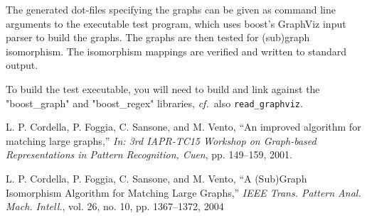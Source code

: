 \documentclass[12pt]{article}
\def\cf{{\it cf.\ }}
\begin{document}
The generated dot-files specifying the graphs can be given as command line
arguments to the executable test program, which uses boost's GraphViz input
parser to build the graphs. The graphs are then tested for (sub)graph
isomorphism. The isomorphism mappings are verified and written to standard
output.

To build the test executable, you will need to build and link against the
"boost\_graph" and "boost\_regex" libraries, \cf also \verb+read_graphviz+.

\begin{thebibliography}{10}

 L. P. Cordella, P. Foggia, C. Sansone, and M. Vento,
    ``An improved algorithm for matching large graphs,'' \emph{In: 3rd IAPR-TC15
    Workshop on Graph-based Representations in Pattern Recognition, Cuen}, 
    pp. 149--159, 2001.

 L. P. Cordella, P. Foggia, C. Sansone, and M. Vento,
    ``A (Sub)Graph Isomorphism Algorithm for Matching Large Graphs,''
    \emph{IEEE Trans. Pattern Anal. Mach. Intell.}, vol. 26, no. 10,
    pp. 1367--1372, 2004

\end{thebibliography}
\end{document}
